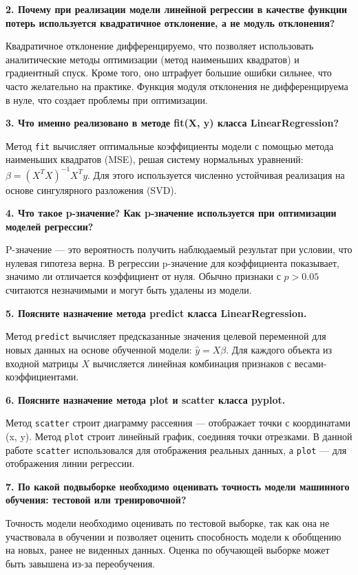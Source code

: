 \textbf{2. Почему при реализации модели линейной регрессии в качестве функции потерь используется квадратичное отклонение, а не модуль отклонения?}

Квадратичное отклонение дифференцируемо, что позволяет использовать аналитические методы оптимизации (метод наименьших квадратов) и градиентный спуск. Кроме того, оно штрафует большие ошибки сильнее, что часто желательно на практике. Функция модуля отклонения не дифференцируема в нуле, что создает проблемы при оптимизации.

\textbf{3. Что именно реализовано в методе fit(X, y) класса LinearRegression?}

Метод \texttt{fit} вычисляет оптимальные коэффициенты модели с помощью метода наименьших квадратов (MSE), решая систему нормальных уравнений: $\beta = (X^T X)^{-1} X^T y$. Для этого используется численно устойчивая реализация на основе сингулярного разложения (SVD).

\textbf{4. Что такое p-значение? Как p-значение используется при оптимизации моделей регрессии?}

P-значение — это вероятность получить наблюдаемый результат при условии, что нулевая гипотеза верна. В регрессии p-значение для коэффициента показывает, значимо ли отличается коэффициент от нуля. Обычно признаки с $p > 0.05$ считаются незначимыми и могут быть удалены из модели.

\textbf{5. Поясните назначение метода predict класса LinearRegression.}

Метод \texttt{predict} вычисляет предсказанные значения целевой переменной для новых данных на основе обученной модели: $\hat{y} = X\beta$. Для каждого объекта из входной матрицы $X$ вычисляется линейная комбинация признаков с весами-коэффициентами.

\textbf{6. Поясните назначение метода plot и scatter класса pyplot.}

Метод \texttt{scatter} строит диаграмму рассеяния — отображает точки с координатами (x, y). Метод \texttt{plot} строит линейный график, соединяя точки отрезками. В данной работе \texttt{scatter} использовался для отображения реальных данных, а \texttt{plot} — для отображения линии регрессии.

\textbf{7. По какой подвыборке необходимо оценивать точность модели машинного обучения: тестовой или тренировочной?}

Точность модели необходимо оценивать по тестовой выборке, так как она не участвовала в обучении и позволяет оценить способность модели к обобщению на новых, ранее не виденных данных. Оценка по обучающей выборке может быть завышена из-за переобучения.

